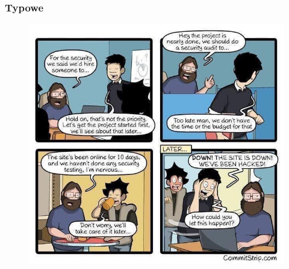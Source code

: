 \documentclass[10pt,t]{beamer}
\begin{document}
\begin{frame}
  \frametitle{Typowe}


  \begin{figure}

    \centering


    \includegraphics[scale=0.34]
    {./PresentationsPictures/Security-01.jpg}

  \end{figure}

\end{frame}
























\end{document}
